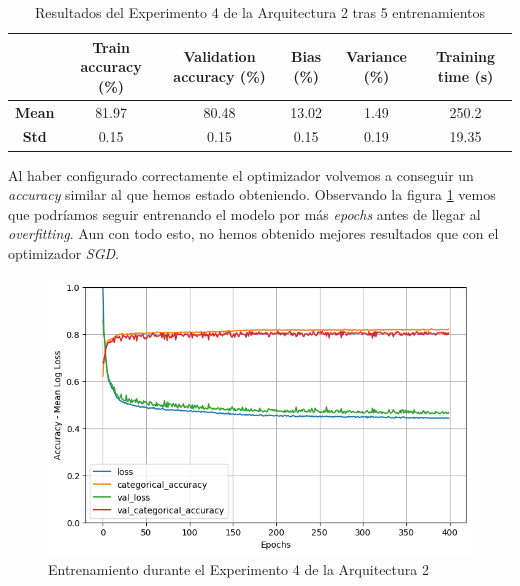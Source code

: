 \documentclass{article}
\begin{document}
			\begin{table}[!h]
				\begin{center}
					\begin{tabular}{ c | c | c | c | c | c |}
						\ & \textbf{Train accuracy (\%)} & \textbf{Validation accuracy (\%)} & \textbf{Bias (\%)} & \textbf{Variance (\%)} & \textbf{Training time (s)} \\ \hline
						\textbf{Mean} & 81.97 & 80.48 & 13.02 & 1.49 & 250.2 \\ \hline
						\textbf{Std} & 0.15 & 0.15 & 0.15 & 0.19 & 19.35 \\ \hline
					\end{tabular}
					\caption{Resultados del Experimento 4 de la Arquitectura 2 tras 5 entrenamientos}
					\label{tab:res-d-a2-e4}
				\end{center}
			\end{table}
			\newpage
			Al haber configurado correctamente el optimizador volvemos a conseguir un \textit{accuracy} similar al que hemos estado obteniendo. Observando la figura \ref{d-tr-a2-e4} vemos que podr\'iamos seguir entrenando el modelo por m\'as \textit{epochs} antes de llegar al \textit{overfitting}. Aun con todo esto, no hemos obtenido mejores resultados que con el optimizador \textit{SGD}.
			\begin{figure}[!h]
				\begin{center}
					\includegraphics[scale=0.5]{d-tr-a2-e4.png}		
					\caption{Entrenamiento durante el Experimento 4 de la Arquitectura 2}	
					\label{d-tr-a2-e4}
				\end{center}
			\end{figure}
			
\end{document}
